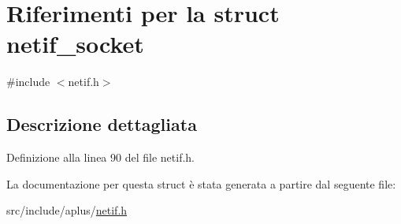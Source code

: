 \hypertarget{structnetif__socket}{\section{Riferimenti per la struct netif\+\_\+socket}
\label{structnetif__socket}
}


{\ttfamily \#include $<$netif.\+h$>$}



\subsection{Descrizione dettagliata}


Definizione alla linea 90 del file netif.\+h.



La documentazione per questa struct è stata generata a partire dal seguente file\+:\begin{DoxyCompactItemize}
\item 
src/include/aplus/\hyperlink{netif_8h}{netif.\+h}\end{DoxyCompactItemize}

